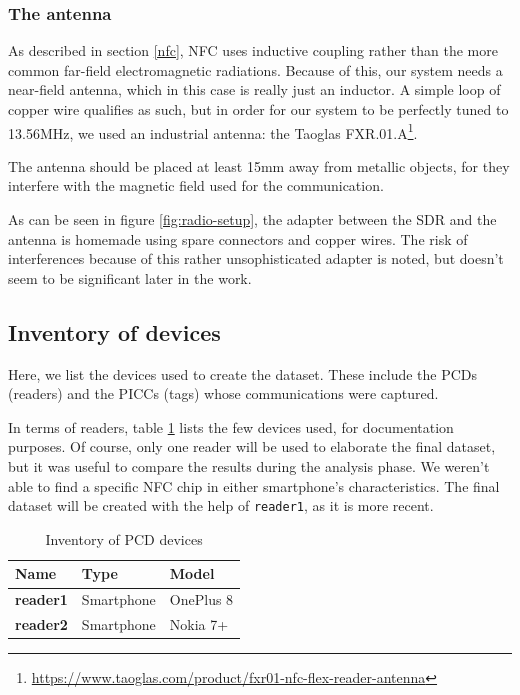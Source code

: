 \subsubsection{The antenna}

As described in section \ref{nfc}, NFC uses inductive coupling rather than the more common far-field electromagnetic radiations. Because of this, our system needs a near-field antenna, which in this case is really just an inductor. A simple loop of copper wire qualifies as such, but in order for our system to be perfectly tuned to 13.56MHz, we used an industrial antenna: the Taoglas FXR.01.A\footnote{\url{https://www.taoglas.com/product/fxr01-nfc-flex-reader-antenna}}.

The antenna should be placed at least 15mm away from metallic objects, for they interfere with the magnetic field used for the communication.

As can be seen in figure \ref{fig:radio-setup}, the adapter between the SDR and the antenna is homemade using spare connectors and copper wires. The risk of interferences because of this rather unsophisticated adapter is noted, but doesn't seem to be significant later in the work.

\newpage
\subsection{Inventory of devices}

Here, we list the devices used to create the dataset. These include the PCDs (readers) and the PICCs (tags) whose communications were captured.

In terms of readers, table \ref{tab:pcd-inventory} lists the few devices used, for documentation purposes. Of course, only one reader will be used to elaborate the final dataset, but it was useful to compare the results during the analysis phase. We weren't able to find a specific NFC chip in either smartphone's characteristics. The final dataset will be created with the help of \texttt{reader1}, as it is more recent.

\begin{table}[h!]
  \centering
  \begin{tabular}{|l|l|l|}
    \hline
    \textbf{Name}    & \textbf{Type} & \textbf{Model} \\ \hline
    \textbf{reader1} & Smartphone    & OnePlus 8      \\ \hline
    \textbf{reader2} & Smartphone    & Nokia 7+       \\ \hline
  \end{tabular}
  \caption{Inventory of PCD devices}
  \label{tab:pcd-inventory}
\end{table}

